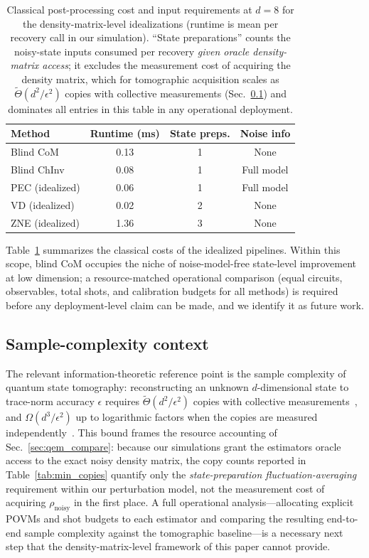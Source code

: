 \documentclass[12pt,a4paper]{article}
\newcommand{\rhon}{\rho_\mathrm{noisy}}
\begin{document}
\begin{table}[!tb]
\caption{Classical post-processing cost and input requirements at $d = 8$ for the density-matrix-level idealizations (runtime is mean per recovery call in our simulation).
``State preparations'' counts the noisy-state inputs consumed per recovery \emph{given oracle density-matrix access}; it excludes the measurement cost of acquiring the density matrix, which for tomographic acquisition scales as $\tilde\Theta(d^2/\epsilon^2)$ copies with collective measurements (Sec.~\ref{sec:sample_complexity}) and dominates all entries in this table in any operational deployment.}
\label{tab:overhead}

\begin{tabular}{lccc}
Method & Runtime (ms) & State preps. & Noise info \\
\hline
Blind CoM      & 0.13 & 1 & None \\
Blind ChInv    & 0.08 & 1 & Full model \\
PEC (idealized) & 0.06 & 1 & Full model \\
VD (idealized)  & 0.02 & 2 & None \\
ZNE (idealized) & 1.36 & 3 & None \\
\end{tabular}

\end{table}

Table~\ref{tab:overhead} summarizes the classical costs of the idealized pipelines.
Within this scope, blind CoM occupies the niche of noise-model-free state-level improvement at low dimension; a resource-matched operational comparison (equal circuits, observables, total shots, and calibration budgets for all methods) is required before any deployment-level claim can be made, and we identify it as future work.


\subsection{Sample-complexity context}
\label{sec:sample_complexity}

The relevant information-theoretic reference point is the sample complexity of quantum state tomography: reconstructing an unknown $d$-dimensional state to trace-norm accuracy $\epsilon$ requires $\tilde\Theta(d^2/\epsilon^2)$ copies with collective measurements~\cite{Haah2017,ODonnellWright2016}, and $\Omega(d^3/\epsilon^2)$ up to logarithmic factors when the copies are measured independently~\cite{Haah2017}.
This bound frames the resource accounting of Sec.~\ref{sec:qem_compare}: because our simulations grant the estimators oracle access to the exact noisy density matrix, the copy counts reported in Table~\ref{tab:min_copies} quantify only the \emph{state-preparation fluctuation-averaging} requirement within our perturbation model, not the measurement cost of acquiring $\rhon$ in the first place.
A full operational analysis---allocating explicit POVMs and shot budgets to each estimator and comparing the resulting end-to-end sample complexity against the tomographic baseline---is a necessary next step that the density-matrix-level framework of this paper cannot provide.
\end{document}
